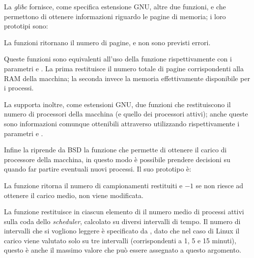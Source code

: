 
La \textsl{glibc} fornisce, come specifica estensione GNU, altre due
funzioni,  e  che permettono
di ottenere informazioni riguardo le pagine di memoria; i loro prototipi sono:

\begin{funcproto}{
}

{La funzioni ritornano il numero di pagine, e non sono previsti
  errori.}  
\end{funcproto}

Queste funzioni sono equivalenti all'uso della funzione 
rispettivamente con i parametri  e
. La prima restituisce il numero totale di pagine
corrispondenti alla RAM della macchina; la seconda invece la memoria
effettivamente disponibile per i processi.

La  supporta inoltre, come estensioni GNU, due funzioni che
restituiscono il numero di processori della macchina (e quello dei processori
attivi); anche queste sono informazioni comunque ottenibili attraverso
 utilizzando rispettivamente i parametri
 e .

Infine la  riprende da BSD la funzione  che
permette di ottenere il carico di processore della macchina, in questo modo è
possibile prendere decisioni su quando far partire eventuali nuovi processi.
Il suo prototipo è:

\begin{funcproto}{
}

{La funzione ritorna il numero di campionamenti restituiti e $-1$ se non
  riesce ad ottenere il carico medio,  non viene modificata.}
\end{funcproto}

La funzione restituisce in ciascun elemento di  il numero medio
di processi attivi sulla coda dello \textit{scheduler}, calcolato su diversi
intervalli di tempo.  Il numero di intervalli che si vogliono leggere è
specificato da , dato che nel caso di Linux il carico viene
valutato solo su tre intervalli (corrispondenti a 1, 5 e 15 minuti), questo è
anche il massimo valore che può essere assegnato a questo argomento.


